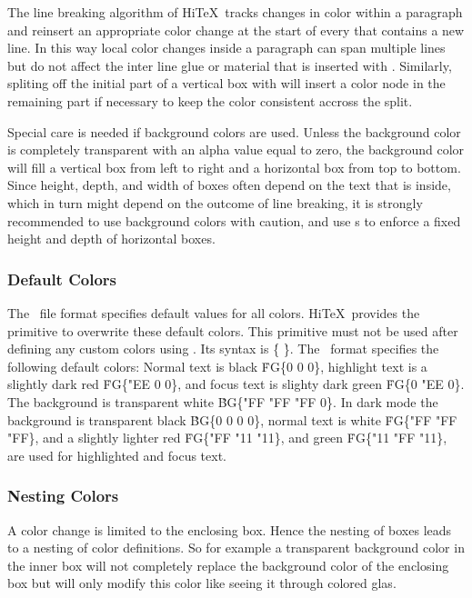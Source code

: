The line breaking algorithm of Hi\TeX\ 
tracks changes in color within a paragraph and reinsert an appropriate
color change at the start of every \ctl{hbox} that contains a new line.
In this way local color changes inside a paragraph can span multiple lines
but do not affect the inter line glue or material that is inserted with
\ctl{vadjust}. Similarly, spliting off the initial part of a vertical
box with \ctl{vsplit} will insert a color node in the remaining part
if necessary to keep the color consistent accross the split.

Special care is needed if background colors are used.
Unless the background color is completely transparent
with an alpha value equal to zero,
the background color will fill a vertical box from left to right
and a horizontal box from top to bottom. Since height, depth, and width of
boxes often depend on the text that is inside, which in turn
might depend on the outcome of line breaking, it is strongly recommended
to use background colors with caution, and use \ctl{strut}s to enforce
a fixed height and depth of horizontal boxes.


\subsubsection{Default Colors}
The \HINT\ file format specifies default values for all colors.
Hi\TeX\ provides the primitive  to overwrite these
default colors. This primitive must not be used after defining any custom
colors using \ctl{HINTcolor}. Its syntax is
\medskip
\prim{} \.{\{}  \.{\}}.
\medskip
The \HINT\ format specifies the following default colors:
Normal text is black \.{FG\{0 0 0\}},
highlight text is a slightly dark red  \.{FG\{"EE 0 0\}},
and focus text is slighty dark green \.{FG\{0 "EE 0\}}.
The background is transparent white \.{BG\{"FF "FF "FF 0\}}.
In dark mode the background is transparent black \.{BG\{0 0 0 0\}},
normal text is white \.{FG\{"FF "FF "FF\}},
and a slightly lighter red \.{FG\{"FF "11 "11\}},
and green \.{FG\{"11 "FF "11\}}, are used for highlighted and focus text.

\subsubsection{Nesting Colors}
A color change is limited to the enclosing box. Hence the
nesting of boxes leads to a nesting of color definitions.
So for example a transparent background color in the inner box
will not completely replace the background color of the enclosing
box but will only modify this color like seeing it through colored glas.

